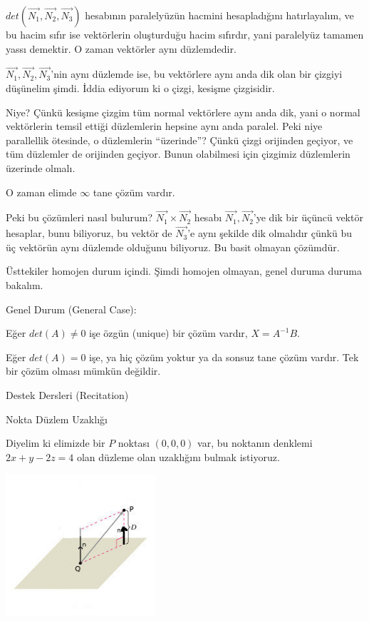 \documentclass[12pt,fleqn]{article}\usepackage{../../common}
\begin{document}
$det(\vec{N_1},\vec{N_2},\vec{N_3})$ hesabının paralelyüzün hacmini
hesapladığını hatırlayalım, ve bu hacim sıfır ise vektörlerin oluşturduğu hacim
sıfırdır, yani paralelyüz tamamen yassı demektir. O zaman vektörler aynı
düzlemdedir.

$\vec{N_1},\vec{N_2},\vec{N_3}$'nin aynı düzlemde ise, bu vektörlere aynı
anda dik olan bir çizgiyi düşünelim şimdi. İddia ediyorum ki o çizgi,
kesişme çizgisidir.

Niye? Çünkü kesişme çizgim tüm normal vektörlere aynı anda dik, yani o
normal vektörlerin temsil ettiği düzlemlerin hepsine aynı anda
paralel. Peki niye parallellik ötesinde, o düzlemlerin ``üzerinde''? Çünkü
çizgi orijinden geçiyor, ve tüm düzlemler de orijinden geçiyor. Bunun
olabilmesi için çizgimiz düzlemlerin üzerinde olmalı.

O zaman elimde $\infty$ tane çözüm vardır. 

Peki bu çözümleri nasıl bulurum? $\vec{N_1} \times \vec{N_2}$ hesabı
$\vec{N_1},\vec{N_2}$'ye dik bir üçüncü vektör hesaplar, bunu biliyoruz, bu
vektör de $\vec{N_3}$'e aynı şekilde dik olmalıdır çünkü bu üç vektörün
aynı düzlemde olduğunu biliyoruz. Bu basit olmayan çözümdür.

Üsttekiler homojen durum içindi. Şimdi homojen olmayan, genel duruma duruma
bakalım.

Genel Durum (General Case):

Eğer $det(A) \ne 0$ işe özgün (unique) bir çözüm vardır, $X = A^{-1}B$. 

Eğer $det(A) = 0$ işe, ya hiç çözüm yoktur ya da sonsuz tane çözüm
vardır. Tek bir çözüm olması mümkün değildir. 

Destek Dersleri (Recitation)

Nokta Düzlem Uzaklığı

Diyelim ki elimizde bir $P$ noktası $(0,0,0)$ var, bu noktanın denklemi $2x + y
- 2z = 4$ olan düzleme olan uzaklığını bulmak istiyoruz.

\includegraphics[width=15em]{4_6.jpg}
\end{document}
